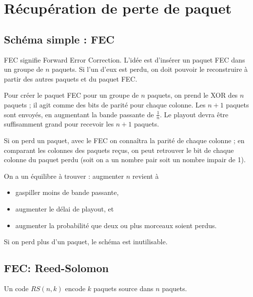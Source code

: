 	
	
		\section{Récupération de perte de paquet}
		
			\subsection{Schéma simple : FEC}
			
			FEC signifie Forward Error Correction. L'idée est d'insérer un paquet FEC dans un groupe de $n$ paquets. Si l'un d'eux est perdu, on doit pouvoir le reconstruire à partir des autres paquets et du paquet FEC.
			
				
			Pour créer le paquet FEC pour un groupe de $n$ paquets, on prend le XOR des $n$ paquets ; il agit comme des bits de parité pour chaque colonne. Les $n + 1$ paquets sont envoyés, en augmentant la bande passante de $\frac{1}{n}$. Le playout devra être suffisamment grand pour recevoir les $n + 1$ paquets.
			
			Si on perd un paquet, avec le FEC on connaîtra la parité de chaque colonne ; en comparant les colonnes des paquets reçus, on peut retrouver le bit de chaque colonne du paquet perdu (soit on a un nombre pair soit un nombre impair de 1).
		
			
			On a un équilibre à trouver : augmenter $n$ revient à
			
			\begin{itemize}
				\item gaspiller moins de bande passante,
				\item augmenter le délai de playout, et
				\item augmenter la probabilité que deux ou plus morceaux soient perdus.
			\end{itemize}
		
			Si on perd plus d'un paquet, le schéma est inutilisable.
			
		
			\subsection{FEC: Reed-Solomon}
			
			Un code $RS(n,k)$ encode $k$ paquets source dans $n$ paquets.
			
			
